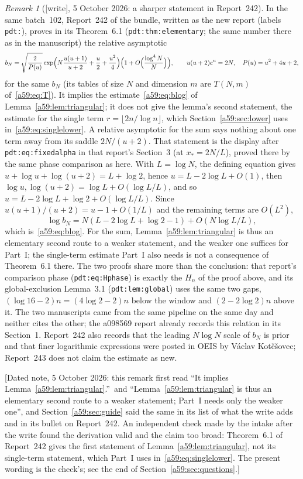 \documentclass[11pt,letterpaper]{article}
\theoremstyle{remark}\newtheorem{remark}[theorem]{Remark}
\newcommand{\wtag}{\textup{[write]}}
\theoremstyle{remark}\newtheorem{wremark}{Remark}\renewcommand{\thewremark}{W\arabic{wremark}}
\theoremstyle{plain}\newtheorem{wcorollary}[wremark]{Corollary}
\begin{document}
\begin{wremark}[\wtag, 5 October 2026: a sharper statement in Report~242]\label{a59:rem:report242}
In the same batch~102, Report~242 of the bundle, written as the new
report  (labels \texttt{pdt:}), proves
in its Theorem~6.1 (\texttt{pdt:thm:elementary}; the same number there as
in the manuscript) the relative asymptotic
\[
 b_N=\sqrt{\frac2{P(u)}}\exp\Bigl(N\frac{u(u+1)}{u+2}+\frac u2+\frac{u^2}4\Bigr)
 \Bigl(1+O\Bigl(\frac{\log^4N}N\Bigr)\Bigr),
 \qquad u(u+2)e^u=2N,\quad P(u)=u^2+4u+2,
\]
for the same $b_N$ (its tables of size $N$ and dimension $m$ are $T(N,m)$
of~\eqref{a59:eq:T}). It implies the estimate~\eqref{a59:eq:blog} of
Lemma~\ref{a59:lem:triangular}; it does not give the lemma's second
statement, the estimate for the single term $r=\lfloor2n/\log n\rfloor$,
which Section~\ref{a59:sec:lower} uses in~\eqref{a59:eq:singlelower}. A
relative asymptotic for the sum says nothing about one term away from its
saddle $2N/(u+2)$. That statement is the display after
\texttt{pdt:eq:fixedalpha} in that report's Section~3 (at $x_*=2N/L$),
proved there by the same phase comparison as here. With
$L=\log N$, the defining equation gives $u+\log u+\log(u+2)=L+\log2$, hence
$u=L-2\log L+O(1)$, then $\log u,\log(u+2)=\log L+O(\log L/L)$, and so
$u=L-2\log L+\log2+O(\log L/L)$. Since
$u(u+1)/(u+2)=u-1+O(1/L)$ and the remaining terms are $O(L^2)$,
\[
 \log b_N=N(L-2\log L+\log2-1)+O(N\log L/L),
\]
which is~\eqref{a59:eq:blog}. For the sum, Lemma~\ref{a59:lem:triangular}
is thus an elementary second route to a weaker statement, and the weaker one
suffices for Part~I; the single-term estimate Part~I also needs is not a
consequence of Theorem~6.1 there. The two proofs share more than the conclusion: that report's
comparison phase (\texttt{pdt:eq:Hphase}) is exactly the $H_n$ of the
proof above, and its global-exclusion Lemma~3.1 (\texttt{pdt:lem:global})
uses the same two gaps, $(\log16-2)n=(4\log2-2)n$ below the window and
$(2-2\log2)n$ above it. The two manuscripts came from the same pipeline on
the same day and neither cites the other; the a098569 report already
records this relation in its Section~1. Report~242 also records that the leading $N\log N$ scale of $b_N$ is
prior and that finer logarithmic expressions were posted in OEIS by
V\'aclav Kot\v{e}\v{s}ovec; Report~243 does not claim the estimate as new.

[Dated note, 5 October 2026: this remark first read ``It implies
Lemma~\ref{a59:lem:triangular}.''\ and ``Lemma~\ref{a59:lem:triangular} is
thus an elementary second route to a weaker statement; Part~I needs only the
weaker one'', and Section~\ref{a59:sec:guide} said the same in its list of
what the write adds and in its bullet on Report~242. An independent check
made by the intake after the write found the derivation valid and the claim
too broad: Theorem~6.1 of Report~242 gives the first statement of
Lemma~\ref{a59:lem:triangular}, not its single-term statement, which Part~I
uses in~\eqref{a59:eq:singlelower}. The present wording is the check's; see
the end of Section~\ref{a59:sec:questions}.]
\end{wremark}
\end{document}
